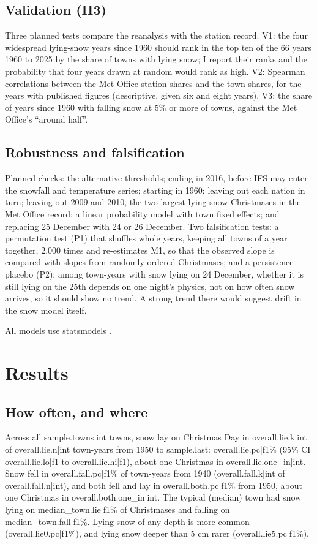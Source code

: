\documentclass[11pt,a4paper]{article}
\begin{document}
\subsection{Validation (H3)}
Three planned tests compare the reanalysis with the station record. V1: the four widespread lying-snow years since 1960 should rank in the top ten of the 66 years 1960 to 2025 by the share of towns with lying snow; I report their ranks and the probability that four years drawn at random would rank as high. V2: Spearman correlations between the Met Office station shares and the town shares, for the years with published figures (descriptive, given six and eight years). V3: the share of years since 1960 with falling snow at 5\% or more of towns, against the Met Office's ``around half''.

\subsection{Robustness and falsification}
Planned checks: the alternative thresholds; ending in 2016, before IFS may enter the snowfall and temperature series; starting in 1960; leaving out each nation in turn; leaving out 2009 and 2010, the two largest lying-snow Christmases in the Met Office record; a linear probability model with town fixed effects; and replacing 25 December with 24 or 26 December. Two falsification tests: a permutation test (P1) that shuffles whole years, keeping all towns of a year together, 2,000 times and re-estimates M1, so that the observed slope is compared with slopes from randomly ordered Christmases; and a persistence placebo (P2): among town-years with snow lying on 24 December, whether it is still lying on the 25th depends on one night's physics, not on how often snow arrives, so it should show no trend. A strong trend there would suggest drift in the snow model itself.

All models use statsmodels \citep{seabold2010}.

\section{Results}\label{sec:results}
\subsection{How often, and where}
Across all {{sample.towns|int}} towns, snow lay on Christmas Day in {{overall.lie.k|int}} of {{overall.lie.n|int}} town-years from 1950 to {{sample.last}}: {{overall.lie.pc|f1}}\% (95\% CI {{overall.lie.lo|f1}} to {{overall.lie.hi|f1}}), about one Christmas in {{overall.lie.one_in|int}}. Snow fell in {{overall.fall.pc|f1}}\% of town-years from 1940 ({{overall.fall.k|int}} of {{overall.fall.n|int}}), and both fell and lay in {{overall.both.pc|f1}}\% from 1950, about one Christmas in {{overall.both.one_in|int}}. The typical (median) town had snow lying on {{median_town.lie|f1}}\% of Christmases and falling on {{median_town.fall|f1}}\%. Lying snow of any depth is more common ({{overall.lie0.pc|f1}}\%), and lying snow deeper than 5 cm rarer ({{overall.lie5.pc|f1}}\%).
\end{document}
